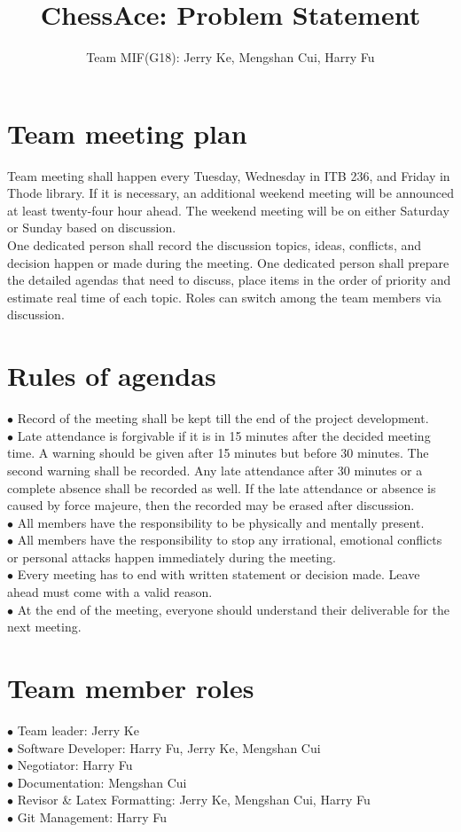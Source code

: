 \documentclass[12pt,letterpaper]{article}
\title{ChessAce: Problem Statement}
\author{Team MIF(G18): Jerry Ke, Mengshan Cui, Harry Fu}
\date{}
\begin{document}
\maketitle
\section{Team meeting plan}
Team meeting shall happen every Tuesday, Wednesday in ITB 236, and Friday in Thode library. If it is necessary, an additional weekend meeting will be announced at least twenty-four hour ahead. The weekend meeting will be on either Saturday or Sunday based on discussion.\\
One dedicated person shall record the discussion topics, ideas, conflicts, and decision happen or made during the meeting. One dedicated person shall prepare the detailed agendas that need to discuss, place items in the order of priority and estimate real time of each topic. Roles can switch among the team members via discussion.\\

\section{Rules of agendas}
$\bullet$ Record of the meeting shall be kept till the end of the project development.\\
$\bullet$ Late attendance is forgivable if it is in 15 minutes after the decided meeting time. A warning should be given after 15 minutes but before 30 minutes. The second warning shall be recorded. Any late attendance after 30 minutes or a complete absence shall be recorded as well. If the late attendance or absence is caused by force majeure, then the recorded may be erased after discussion.\\
$\bullet$ All members have the responsibility to be physically and mentally present.\\
$\bullet$ All members have the responsibility to stop any irrational, emotional conflicts or personal attacks happen immediately during the meeting.\\
$\bullet$ Every meeting has to end with written statement or decision made. Leave ahead must come with a valid reason.\\
$\bullet$ At the end of the meeting, everyone should understand their deliverable for the next meeting.\\

\section{Team member roles}
$\bullet$ Team leader: Jerry Ke\\
$\bullet$ Software Developer: Harry Fu, Jerry Ke, Mengshan Cui\\
$\bullet$ Negotiator: Harry Fu\\
$\bullet$ Documentation: Mengshan Cui\\
$\bullet$ Revisor \& Latex Formatting: Jerry Ke, Mengshan Cui, Harry Fu\\
$\bullet$ Git Management: Harry Fu\\
\end{document}
